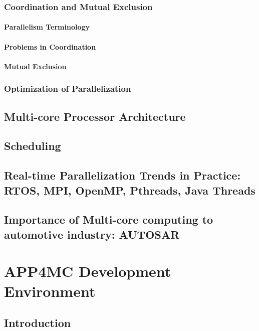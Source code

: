 \subsection{Coordination and Mutual Exclusion}
\subsubsection{Parallelism Terminology}  %
\subsubsection{Problems in Coordination} %
\subsubsection{Mutual Exclusion} %
\subsection{Optimization of Parallelization}
\section{Multi-core Processor Architecture}
\section{Scheduling} %
\section{Real-time Parallelization Trends in Practice: RTOS, MPI, OpenMP, Pthreads, Java Threads} %
\section{Importance of Multi-core computing to automotive industry: AUTOSAR}

\chapter{APP4MC Development Environment}
\section{Introduction} %
